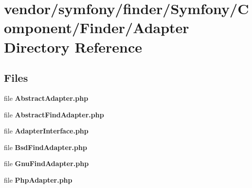 \section{vendor/symfony/finder/\+Symfony/\+Component/\+Finder/\+Adapter Directory Reference}
\label{dir_db59cdc66c8567be244cde9068b5974a}
\subsection*{Files}
\begin{DoxyCompactItemize}
\item 
file {\bf Abstract\+Adapter.\+php}
\item 
file {\bf Abstract\+Find\+Adapter.\+php}
\item 
file {\bf Adapter\+Interface.\+php}
\item 
file {\bf Bsd\+Find\+Adapter.\+php}
\item 
file {\bf Gnu\+Find\+Adapter.\+php}
\item 
file {\bf Php\+Adapter.\+php}
\end{DoxyCompactItemize}
